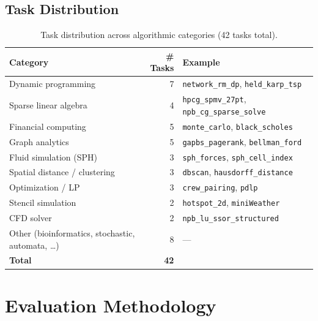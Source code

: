 \documentclass{article}
\begin{document}
\subsection{Task Distribution}

\begin{table}[ht]
\centering
\small
\caption{Task distribution across algorithmic categories (42 tasks total).}
\label{tab:categories}
\begin{tabular}{@{}lrl@{}}
\toprule
\textbf{Category} & \textbf{\# Tasks} & \textbf{Example} \\
\midrule
Dynamic programming          & 7 & \texttt{network\_rm\_dp}, \texttt{held\_karp\_tsp} \\
Sparse linear algebra        & 4 & \texttt{hpcg\_spmv\_27pt}, \texttt{npb\_cg\_sparse\_solve} \\
Financial computing          & 5 & \texttt{monte\_carlo}, \texttt{black\_scholes} \\
Graph analytics              & 5 & \texttt{gapbs\_pagerank}, \texttt{bellman\_ford} \\
Fluid simulation (SPH)       & 3 & \texttt{sph\_forces}, \texttt{sph\_cell\_index} \\
Spatial distance / clustering& 3 & \texttt{dbscan}, \texttt{hausdorff\_distance} \\
Optimization / LP            & 3 & \texttt{crew\_pairing}, \texttt{pdlp} \\
Stencil simulation           & 2 & \texttt{hotspot\_2d}, \texttt{miniWeather} \\
CFD solver                   & 2 & \texttt{npb\_lu\_ssor\_structured} \\
Other (bioinformatics, stochastic, automata, \ldots) & 8 & --- \\
\midrule
\textbf{Total}               & \textbf{42} & \\
\bottomrule
\end{tabular}
\end{table}

\section{Evaluation Methodology}
\label{sec:eval}
\end{document}
